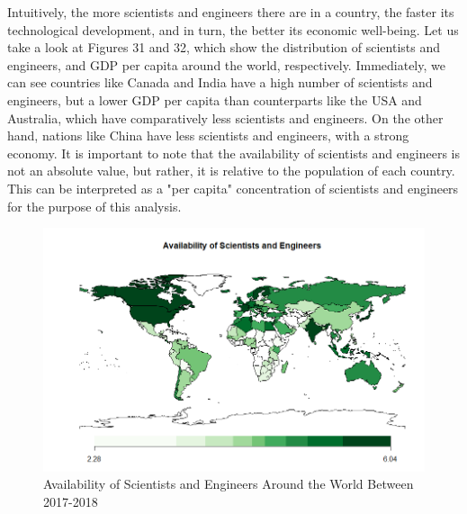 \documentclass[15pt]{article}
\begin{document}
Intuitively, the more scientists and engineers there are in a country, the faster its technological development, and in turn, the better its economic well-being. Let us take a look at Figures 31 and 32, which show the distribution of scientists and engineers, and GDP per capita around the world, respectively. Immediately, we can see countries like Canada and India have a high number of scientists and engineers, but a lower GDP per capita than counterparts like the USA and Australia, which have comparatively less scientists and engineers. On the other hand, nations like China have less scientists and engineers, with a strong economy. It is important to note that the availability of scientists and engineers is not an absolute value, but rather, it is relative to the population of each country. This can be interpreted as a "per capita" concentration of scientists and engineers for the purpose of this analysis.
\\
\begin{figure}[H]
    \centering
    \includegraphics[scale = 0.7]{Part6_stem_avail.png}
    \caption{Availability of Scientists and Engineers Around the World Between 2017-2018}
\end{figure}
\end{document}
